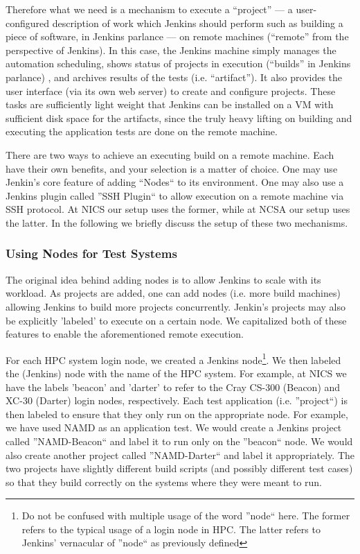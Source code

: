 \documentclass[AMA]{WileyNJD-v1}
\begin{document}
Therefore what we need is a mechanism to execute a ``project'' --- a user-configured description of work which Jenkins should perform such as building a piece of software, in Jenkins parlance --- on remote machines (``remote'' from the perspective of Jenkins). 
In this case, the Jenkins machine simply manages the automation scheduling, shows status of projects in execution (``builds'' in Jenkins parlance) , and archives results of the tests (i.e. ``artifact''). 
It also provides the user interface (via its own web server) to create and configure projects. 
These tasks are sufficiently light weight that Jenkins can be installed on a VM with sufficient disk space for the artifacts, since the truly heavy lifting on building and executing the application tests are done on the remote machine.

There are two ways to achieve an executing build on a remote machine. 
Each have their own benefits, and your selection is a matter of choice. 
One may use Jenkin's core feature of adding ``Nodes`` to its environment. 
One may also use a Jenkins plugin called ''SSH Plugin`` to allow execution on a remote machine via SSH protocol. 
At NICS our setup uses the former, while at NCSA our setup uses the latter. 
In the following we briefly discuss the setup of these two mechanisms.

\subsubsection{Using Nodes for Test Systems}
The original idea behind adding nodes is to allow Jenkins to scale with its workload. 
As projects are added, one can add nodes (i.e. more build machines) allowing Jenkins to build more projects concurrently. 
Jenkin's projects may also be explicitly 'labeled' to execute on a certain node. 
We capitalized both of these features to enable the aforementioned remote execution.

For each HPC system login node, we created a Jenkins node\footnote{Do not be confused with multiple usage of the word ''node`` here. 
The former refers to the typical usage of a login node in HPC. 
The latter refers to Jenkins' vernacular of ''node`` as previously defined}. 
We then labeled the (Jenkins) node with the name of the HPC system. 
For example, at NICS we have the labels 'beacon' and 'darter' to refer to the Cray CS-300 (Beacon) and XC-30 (Darter) login nodes, respectively. 
Each test application (i.e. ''project``) is then labeled to ensure that they only run on the appropriate node. 
For example, we have used NAMD \cite{namd} as an application test. 
We would create a Jenkins project called ''NAMD-Beacon`` and label it to run only on the ''beacon`` node. 
We would also create another project called ''NAMD-Darter`` and label it appropriately. 
The two projects have slightly different build scripts (and possibly different test cases) so that they build correctly on the systems where they were meant to run.
\end{document}
